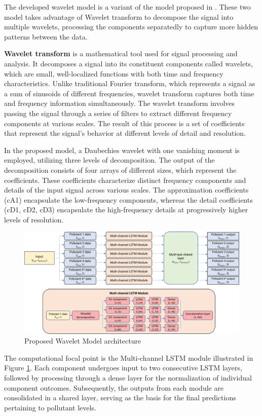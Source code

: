 The developed wavelet model is a variant of the model proposed in \cite{WaveletNLSTM}. These two model takes advantage of Wavelet transform to decompose the signal into multiple wavelets, processing the components separatedly to capture more hidden patterns between the data.

\textbf{Wavelet transform} is a mathematical tool used for signal processing and analysis. It decomposes a signal into its constituent components called wavelets, which are small, well-localized functions with both time and frequency characteristics. Unlike traditional Fourier transform, which represents a signal as a sum of sinusoids of different frequencies, wavelet transform captures both time and frequency information simultaneously.
The wavelet transform involves passing the signal through a series of filters to extract different frequency components at various scales. The result of this process is a set of coefficients that represent the signal's behavior at different levels of detail and resolution.

In the proposed model, a Daubechies wavelet with one vanishing moment is employed, utilizing three levels of decomposition. The output of the decomposition consists of four arrays of different sizes, which represent the coefficients. These coefficients characterize distinct frequency components and details of the input signal across various scales. The approximation coefficients (cA1) encapsulate the low-frequency components, whereas the detail coefficients (cD1, cD2, cD3) encapsulate the high-frequency details at progressively higher levels of resolution. 


\begin{figure}
    \centering
    \includegraphics[width=1\linewidth]{images/model architectures/waveletmodel.png}
    \caption{Proposed Wavelet Model architecture}
    \label{fig:waveletmodel}
\end{figure}

The computational focal point is the Multi-channel LSTM module illustrated in Figure \ref{fig:waveletmodel}. Each component undergoes input to two consecutive LSTM layers, followed by processing through a dense layer for the normalization of individual component outcomes. Subsequently, the outputs from each module are consolidated in a shared layer, serving as the basis for the final predictions pertaining to pollutant levels.
